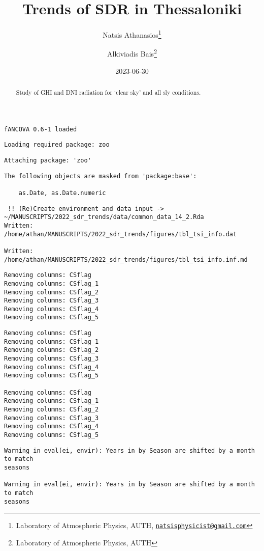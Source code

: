 \documentclass[
  10pt,
  a4paper,oneside]{article}
\title{Trends of SDR in Thessaloniki}
\author{Natsis Athanasios\footnote{Laboratory of Atmospheric Physics, AUTH, \href{mailto:natsisphysicist@gmail.com}{\nolinkurl{natsisphysicist@gmail.com}}} \and Alkiviadis Bais\footnote{Laboratory of Atmospheric Physics, AUTH}}
\date{2023-06-30}
\begin{document}
\maketitle
\begin{abstract}
Study of GHI and DNI radiation for `clear sky' and all sly conditions.
\end{abstract}

{
\hypersetup{linkcolor=}
\setcounter{tocdepth}{4}
\tableofcontents
}
\begin{verbatim}
fANCOVA 0.6-1 loaded
\end{verbatim}

\begin{verbatim}
Loading required package: zoo
\end{verbatim}

\begin{verbatim}
Attaching package: 'zoo'
\end{verbatim}

\begin{verbatim}
The following objects are masked from 'package:base':

    as.Date, as.Date.numeric
\end{verbatim}

\begin{verbatim}
 !! (Re)Create environment and data input -> ~/MANUSCRIPTS/2022_sdr_trends/data/common_data_14_2.Rda 
Written:  /home/athan/MANUSCRIPTS/2022_sdr_trends/figures/tbl_tsi_info.dat 

Written:  /home/athan/MANUSCRIPTS/2022_sdr_trends/figures/tbl_tsi_info.inf.md 
\end{verbatim}

\begin{verbatim}
Removing columns: CSflag
Removing columns: CSflag_1
Removing columns: CSflag_2
Removing columns: CSflag_3
Removing columns: CSflag_4
Removing columns: CSflag_5
\end{verbatim}

\begin{verbatim}
Removing columns: CSflag
Removing columns: CSflag_1
Removing columns: CSflag_2
Removing columns: CSflag_3
Removing columns: CSflag_4
Removing columns: CSflag_5

Removing columns: CSflag
Removing columns: CSflag_1
Removing columns: CSflag_2
Removing columns: CSflag_3
Removing columns: CSflag_4
Removing columns: CSflag_5
\end{verbatim}

\begin{verbatim}
Warning in eval(ei, envir): Years in by Season are shifted by a month to match
seasons

Warning in eval(ei, envir): Years in by Season are shifted by a month to match
seasons
\end{verbatim}
\end{document}

